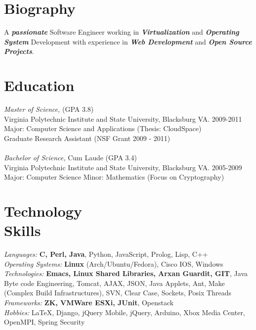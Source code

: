 \documentclass[line,margin]{res}
\begin{document}
\address{2132 Sterling Green Dr, Morrisville, NC 27560}
\address{Email: vtwoods@gmail.com --- Cell: (703)475-1337}

 
\begin{resume}
 
\section{Biography} A \textbf{\emph{passionate}} Software Engineer working in \textbf{\emph{Virtualization}} and \textbf{\emph{Operating System}} Development with experience in \textbf{\emph{Web Development}} and \textbf{\emph{Open Source Projects}}. 
 
 
\section{Education} 
        {\sl Master of Science,} (GPA 3.8) \\
        Virginia Polytechnic Institute and State University, Blacksburg VA. 2009-2011 \\
        Major: Computer Science and Applications (Thesis:  CloudSpace) \\
        Graduate Research Assistant (NSF Grant 2009 - 2011)\\
\\[-5pt]
        {\sl Bachelor of Science,} Cum Laude (GPA 3.4) \\
        Virginia Polytechnic Institute and State University, Blacksburg VA. 2005-2009 \\
        Major: Computer Science Minor: Mathematics (Focus on Cryptography)

 
\section{Technology \\ Skills} {\sl Languages:} \textbf{C, Perl, Java}, Python, JavaScript, Prolog, Lisp, C++ \\
                {\sl Operating Systems:} \textbf{Linux} (Arch/Ubuntu/Fedora), Cisco IOS, Windows \\
                {\sl Technologies:} \textbf{Emacs, Linux Shared Libraries, Arxan Guardit, GIT}, Java Byte code Engineering, Tomcat, AJAX, JSON,
                Java Applets, Ant, Make (Complex Build Infrastructures), SVN, Clear Case, Sockets, Posix Threads \\
                {\sl Frameworks:} \textbf{ZK, VMWare ESXi, JUnit}, Openstack \\
                {\sl Hobbies:} \LaTeX, Django, jQuery Mobile, jQuery, Arduino, Xbox Media Center, OpenMPI, Spring Security
 

\end{resume}
\end{document}

